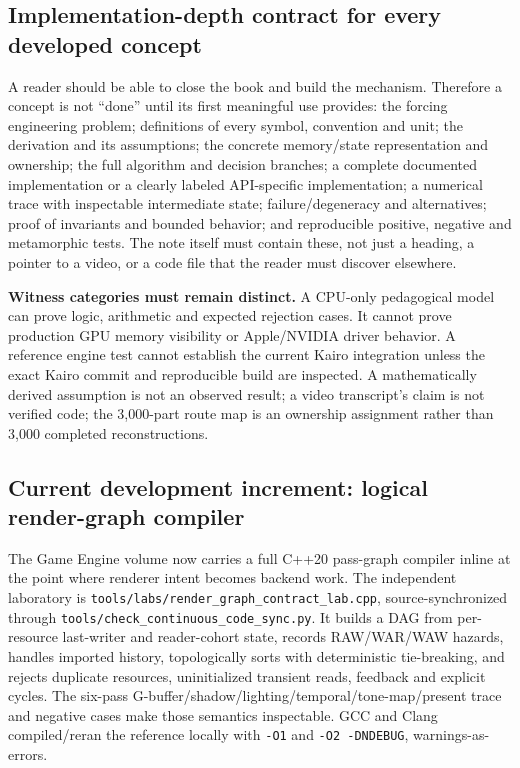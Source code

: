 \subsection{Implementation-depth contract for every developed concept}\label{appendix-28e6f216fdc7-implementation-depth-contract-for-every-developed-concept}

A reader should be able to close the book and build the mechanism. Therefore a concept is not ``done'' until its first meaningful use provides: the forcing engineering problem; definitions of every symbol, convention and unit; the derivation and its assumptions; the concrete memory/state representation and ownership; the full algorithm and decision branches; a complete documented implementation or a clearly labeled API-specific implementation; a numerical trace with inspectable intermediate state; failure/degeneracy and alternatives; proof of invariants and bounded behavior; and reproducible positive, negative and metamorphic tests. The note itself must contain these, not just a heading, a pointer to a video, or a code file that the reader must discover elsewhere.

\textbf{Witness categories must remain distinct.} A CPU-only pedagogical model can prove logic, arithmetic and expected rejection cases. It cannot prove production GPU memory visibility or Apple/NVIDIA driver behavior. A reference engine test cannot establish the current Kairo integration unless the exact Kairo commit and reproducible build are inspected. A mathematically derived assumption is not an observed result; a video transcript's claim is not verified code; the 3,000-part route map is an ownership assignment rather than 3,000 completed reconstructions.

\subsection{Current development increment: logical render-graph compiler}\label{appendix-28e6f216fdc7-current-development-increment-logical-render-graph-compiler}

The Game Engine volume now carries a full C++20 pass-graph compiler inline at the point where renderer intent becomes backend work. The independent laboratory is \texttt{tools/labs/render\_graph\_contract\_lab.cpp}, source-synchronized through \texttt{tools/check\_continuous\_code\_sync.py}. It builds a DAG from per-resource last-writer and reader-cohort state, records RAW/WAR/WAW hazards, handles imported history, topologically sorts with deterministic tie-breaking, and rejects duplicate resources, uninitialized transient reads, feedback and explicit cycles. The six-pass G-buffer/shadow/lighting/temporal/tone-map/present trace and negative cases make those semantics inspectable. GCC and Clang compiled/reran the reference locally with \texttt{-O1} and \texttt{-O2\ -DNDEBUG}, warnings-as-errors.

